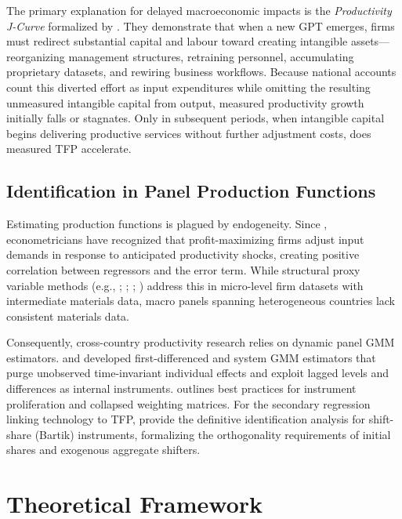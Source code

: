 \documentclass[11pt,a4paper]{article}
\begin{document}
The primary explanation for delayed macroeconomic impacts is the \emph{Productivity J-Curve} formalized by \citet{brynjolfsson2021}. They demonstrate that when a new GPT emerges, firms must redirect substantial capital and labour toward creating intangible assets---reorganizing management structures, retraining personnel, accumulating proprietary datasets, and rewiring business workflows. Because national accounts count this diverted effort as input expenditures while omitting the resulting unmeasured intangible capital from output, measured productivity growth initially falls or stagnates. Only in subsequent periods, when intangible capital begins delivering productive services without further adjustment costs, does measured TFP accelerate.

\subsection{Identification in Panel Production Functions}
Estimating production functions is plagued by endogeneity. Since \citet{marschak1944}, econometricians have recognized that profit-maximizing firms adjust input demands in response to anticipated productivity shocks, creating positive correlation between regressors and the error term. While structural proxy variable methods (e.g., \citealp{olley1996}; \citealp{levinsohn2003}; \citealp{ackerberg2015}; \citealp{wooldridge2009}) address this in micro-level firm datasets with intermediate materials data, macro panels spanning heterogeneous countries lack consistent materials data. 

Consequently, cross-country productivity research relies on dynamic panel GMM estimators. \citet{arellano1991} and \citet{blundell1998} developed first-differenced and system GMM estimators that purge unobserved time-invariant individual effects and exploit lagged levels and differences as internal instruments. \citet{roodman2009} outlines best practices for instrument proliferation and collapsed weighting matrices. For the secondary regression linking technology to TFP, \citet{goldsmith2020} provide the definitive identification analysis for shift-share (Bartik) instruments, formalizing the orthogonality requirements of initial shares and exogenous aggregate shifters.

\section{Theoretical Framework}
\label{sec:theory}
\end{document}
